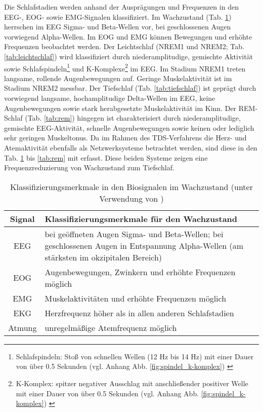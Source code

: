 Die Schlafstadien werden anhand der Ausprägungen und Frequenzen in den \acs{EEG}-, \acs{EOG}- sowie \acs{EMG}-Signalen klassifiziert. Im Wachzustand (Tab. \ref{tab:wach}) herrschen im \acs{EEG} Sigma- und Beta-Wellen vor, bei geschlossenen Augen vorwiegend Alpha-Wellen. Im \acs{EOG} und \acs{EMG} können Bewegungen und erhöhte Frequenzen beobachtet werden. Der Leichtschlaf (\acs{NREM}1 und \acs{NREM}2; Tab. \ref{tab:leichtschlaf}) wird klassifiziert durch niederamplitudige, gemischte Aktivität sowie Schlafspindeln\footnote{Schlafspindeln: Stoß von schnellen Wellen (12 Hz bis 14 Hz) mit einer Dauer von über 0.5 Sekunden (vgl. Anhang Abb. \ref{fig:spindel_k-komplex}) \parencite{lee-chiong_sleep_2008}} und K-Komplexe\footnote{K-Komplex: spitzer negativer Ausschlag mit anschließender positiver Welle mit einer Dauer von über 0.5 Sekunden (vgl. Anhang Abb. \ref{fig:spindel_k-komplex}) \parencite{lee-chiong_sleep_2008}} im \acs{EEG}. Im Stadium \acs{NREM}1 treten langsame, rollende Augenbewegungen auf. Geringe Muskelaktivität ist im Stadium \acs{NREM}2 messbar. Der Tiefschlaf (Tab. \ref{tab:tiefschlaf}) ist geprägt durch vorwiegend langsame, hochamplitudige Delta-Wellen im \acs{EEG}, keine Augenbewegungen sowie stark herabgesetzte Muskelaktivität im Kinn. Der \acs{REM}-Schlaf (Tab. \ref{tab:rem}) hingegen ist charakterisiert durch niederamplitudige, gemischte \acs{EEG}-Aktivität, schnelle Augenbewegungen sowie keinen oder lediglich sehr geringen Muskeltonus. Da im Rahmen des \acs{TDS}-Verfahrens die Herz- und Atemaktivität ebenfalls als Netzwerksysteme betrachtet werden, sind diese in den Tab. \ref{tab:wach} bis \ref{tab:rem} mit erfasst. Diese beiden Systeme zeigen eine Frequenzreduzierung von Wachzustand zum Tiefschlaf. \parencite{lee-chiong_sleep_2008, steinberg_schlafmedizin_2010, rasche_update_2003, ebner_eeg_2006}

\begin{table}[H] 
\begin{small}
\begin{tabularx}{\textwidth}{cX}
\toprule
\multicolumn{1}{c}{\textbf{Signal}} & \multicolumn{1}{l}{\textbf{Klassifizierungsmerkmale für den Wachzustand}}\\  
\midrule
\acs{EEG} & bei geöffneten Augen Sigma- und Beta-Wellen; bei geschlossenen Augen in Entspannung Alpha-Wellen (am stärksten im okzipitalen Bereich)\\
\acs{EOG} & Augenbewegungen, Zwinkern und erhöhte Frequenzen möglich\\
\acs{EMG} & Muskelaktivitäten und erhöhte Frequenzen möglich\\
\acs{EKG} & Herzfrequenz höher als in allen anderen Schlafstadien\\
Atmung & unregelmäßige Atemfrequenz möglich\\
\bottomrule
\end{tabularx}
\caption[Klassifizierungsmerkmale im Wachzustand]{Klassifizierungsmerkmale in den Biosignalen im Wachzustand (unter Verwendung von \parencite{lee-chiong_sleep_2008, steinberg_schlafmedizin_2010, rasche_update_2003, ebner_eeg_2006})}
\label{tab:wach}
\end{small}
\end{table}


